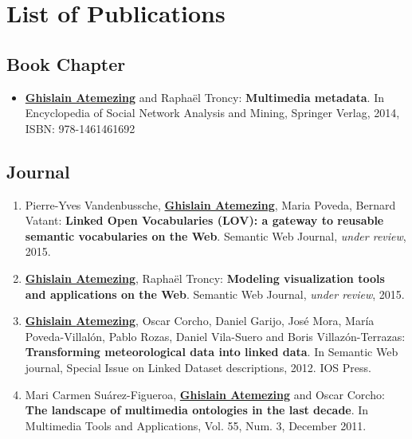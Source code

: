 \chapter*{List of Publications}

\section*{Book Chapter}
\label{sec:book}
\begin{itemize}
\item \underline{\textbf{Ghislain Atemezing}} and {R}apha{\"e}l {T}roncy: \textbf{{M}ultimedia metadata}. {I}n {E}ncyclopedia of {S}ocial {N}etwork {A}nalysis and {M}ining, {S}pringer {V}erlag, 2014, {ISBN}: 978-1461461692
\end{itemize}

\section*{Journal}
\label{sec:journal}
\begin{enumerate}
 \item Pierre-Yves Vandenbussche, \underline{\textbf{Ghislain Atemezing}}, Maria Poveda, Bernard Vatant: \textbf{Linked Open Vocabularies (LOV): a gateway to reusable semantic vocabularies on the Web}. Semantic Web Journal, \emph{under review}, 2015.
 \item \underline{\textbf{Ghislain Atemezing}}, {R}apha{\"e}l {T}roncy: \textbf{Modeling visualization tools and applications on the Web}. Semantic Web Journal, \emph{under review}, 2015.
 \item \underline{\textbf{{G}hislain {A}temezing}}, {O}scar {C}orcho,  {D}aniel {G}arijo, {J}os{\'e} {M}ora, {M}ar{\'i}a {P}oveda-{V}illal{\'o}n, {P}ablo {R}ozas, {D}aniel {V}ila-{S}uero and {B}oris {V}illaz{\'o}n-{T}errazas: \textbf{{T}ransforming meteorological data into linked data}. In {S}emantic {W}eb journal, {S}pecial {I}ssue on {L}inked {D}ataset descriptions, 2012. {IOS} {P}ress.

 \item Mari Carmen Su\'{a}rez-Figueroa, \underline{\textbf{Ghislain Atemezing}} and Oscar Corcho: \textbf{The landscape of multimedia ontologies in the last decade}. In Multimedia Tools and Applications, Vol. 55, Num. 3, December 2011.
\end{enumerate}

